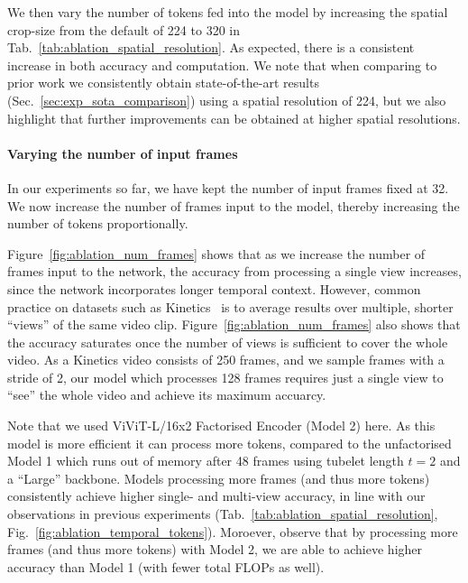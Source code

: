 We then vary the number of tokens fed into the model by increasing the spatial crop-size from the default of 224 to 320 in Tab.~\ref{tab:ablation_spatial_resolution}.
As expected, there is a consistent increase in both accuracy and computation. We note that when comparing to prior work we consistently obtain state-of-the-art results (Sec.~\ref{sec:exp_sota_comparison}) using a spatial resolution of 224, but we also highlight that further improvements can be obtained at higher spatial resolutions.




\paragraph{Varying the number of input frames}




In our experiments so far, we have kept the number of input frames fixed at 32.
We now increase the number of frames input to the model, thereby increasing the number of tokens proportionally.

Figure~\ref{fig:ablation_num_frames} shows that as we increase the number of frames input to the network, the accuracy from processing a single view increases, since the network incorporates longer temporal context.
However, common practice on datasets such as Kinetics~\cite{feichtenhofer_iccv_2019, wang_cvpr_2018, li_tea_cvpr_2020} is to average results over multiple, shorter ``views'' of the same video clip.
Figure~\ref{fig:ablation_num_frames} also shows that the accuracy saturates once the number of views is sufficient to cover the whole video.
As a Kinetics video consists of 250 frames, and we sample frames with a stride of 2, our model which processes 128 frames requires just a single view to ``see'' the whole video and achieve its maximum accuarcy.

Note that we used  ViViT-L/16x2 Factorised Encoder (Model 2) here.
As this model is more efficient it can process more tokens, compared to the unfactorised Model 1 which runs out of memory after 48 frames using tubelet length $t = 2$ and a ``Large'' backbone.
Models processing more frames (and thus more tokens) consistently achieve higher single- and multi-view accuracy, in line with our observations in previous experiments (Tab.~\ref{tab:ablation_spatial_resolution}, Fig.~\ref{fig:ablation_temporal_tokens}).
Moroever, observe that by processing more frames (and thus more tokens) with Model 2, we are able to achieve higher accuracy than Model 1 (with fewer total FLOPs as well).

